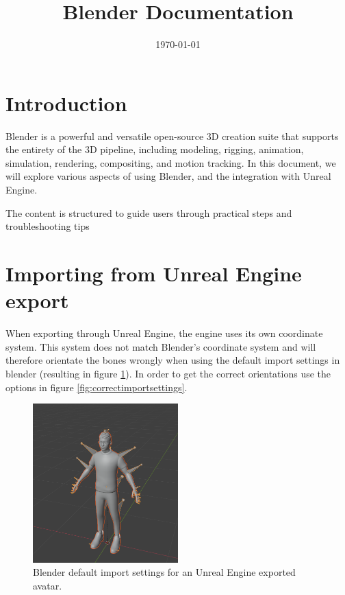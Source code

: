 \documentclass{uva-inf-article}
\title{Blender Documentation}
\date{\today}
\begin{document}
\maketitle
\tableofcontents
\newpage


\section{Introduction}
Blender is a powerful and versatile open-source 3D creation suite that supports the entirety of the 3D pipeline, including modeling, rigging, animation, simulation, rendering, compositing, and motion tracking. In this document, we will explore various aspects of using Blender, and the integration with Unreal Engine.

The content is structured to guide users through practical steps and troubleshooting tips


\section{Importing from Unreal Engine export}
When exporting through Unreal Engine, the engine uses its own coordinate system. This system does not match Blender's coordinate system and will therefore orientate the bones wrongly when using the default import settings in blender (resulting in figure \ref{fig:wrongimport}). In order to get the correct orientations use the options in figure \ref{fig:correctimportsettings}.

\begin{figure}[hbt!]
    \centering
    \includegraphics[width=0.5\textwidth]{imgs/wrongorientation.png}
    \caption{Blender default import settings for an Unreal Engine exported avatar.}
    \label{fig:wrongimport}
\end{figure}
\end{document}
